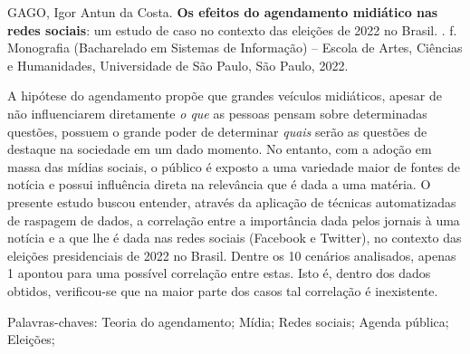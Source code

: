 \documentclass[
	12pt,
	oneside,
	a4paper,
	english,
	brazil
]{abntex2ppgsi}
\begin{document}
\setlength{\absparsep}{18pt}
\begin{resumo}

\begin{flushleft}
GAGO, Igor Antun da Costa. \textbf{Os efeitos do agendamento midiático nas redes sociais}: um estudo de caso no contexto das eleições de 2022 no Brasil. \imprimirdata. \pageref{LastPage} f. Monografia (Bacharelado em Sistemas de Informação) – Escola de Artes, Ciências e Humanidades, Universidade de São Paulo, São Paulo, 2022.
\end{flushleft}

A hipótese do agendamento propõe que grandes veículos midiáticos, apesar de não influenciarem diretamente \textit{o que} as pessoas pensam sobre determinadas questões, possuem o grande poder de determinar \textit{quais} serão as questões de destaque na sociedade em um dado momento. No entanto, com a adoção em massa das mídias sociais, o público é exposto a uma variedade maior de fontes de notícia e possui influência direta na relevância que é dada a uma matéria. O presente estudo buscou entender, através da aplicação de técnicas automatizadas de raspagem de dados, a correlação entre a importância dada pelos jornais à uma notícia e a que lhe é dada nas redes sociais (Facebook e Twitter), no contexto das eleições presidenciais de 2022 no Brasil. Dentre os 10 cenários analisados, apenas 1 apontou para uma possível correlação entre estas. Isto é, dentro dos dados obtidos, verificou-se que na maior parte dos casos tal correlação é inexistente. 

Palavras-chaves: Teoria do agendamento; Mídia; Redes sociais; Agenda pública; Eleições;
\end{resumo}
\end{document}
